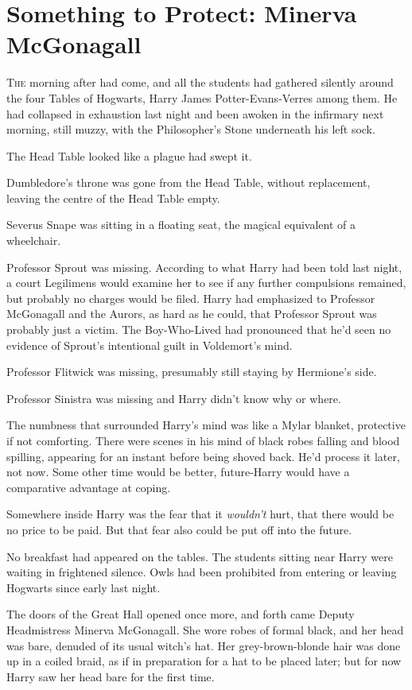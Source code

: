 \chapter{Something to Protect: Minerva McGonagall}

\lettrine{T}{he} morning after
had come, and all the students had gathered silently around the four Tables of
Hogwarts, Harry James Potter-Evans-Verres among them. He had collapsed in
exhaustion last night and been awoken in the infirmary next morning, still
muzzy, with the Philosopher’s Stone underneath his left sock.

The Head Table looked like a plague had swept it.

Dumbledore’s throne was gone from the Head Table, without replacement, leaving
the centre of the Head Table empty.

Severus Snape was sitting in a floating seat, the magical equivalent of a
wheelchair.

Professor Sprout was missing. According to what Harry had been told last night,
a court Legilimens would examine her to see if any further compulsions
remained, but probably no charges would be filed. Harry had emphasized to
Professor McGonagall and the Aurors, as hard as he could, that Professor Sprout
was probably just a victim. The Boy-Who-Lived had pronounced that he’d seen no
evidence of Sprout’s intentional guilt in Voldemort’s mind.

Professor Flitwick was missing, presumably still staying by Hermione’s side.

Professor Sinistra was missing and Harry didn’t know why or where.

The numbness that surrounded Harry’s mind was like a Mylar blanket, protective
if not comforting. There were scenes in his mind of black robes falling and
blood spilling, appearing for an instant before being shoved back. He’d process
it later, not now. Some other time would be better, future-Harry would have a
comparative advantage at coping.

Somewhere inside Harry was the fear that it \emph{wouldn’t} hurt, that there
would be no price to be paid. But that fear also could be put off into the
future.

No breakfast had appeared on the tables. The students sitting near Harry were
waiting in frightened silence. Owls had been prohibited from entering or
leaving Hogwarts since early last night.

The doors of the Great Hall opened once more, and forth came Deputy
Headmistress Minerva McGonagall. She wore robes of formal black, and her head
was bare, denuded of its usual witch’s hat. Her grey-brown-blonde hair was done
up in a coiled braid, as if in preparation for a hat to be placed later; but
for now Harry saw her head bare for the first time.

